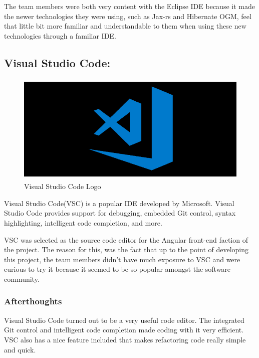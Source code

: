 The team members were both very content with the Eclipse IDE because it made the newer technologies they were using, such as Jax-rs and Hibernate OGM, feel that little bit more familiar and understandable to them when using these new technologies through a familiar IDE.


\subsection{Visual Studio Code:}
\label{sec:TechnologyReviewVSC}
\begin{figure}[H]
    \centering
    \includegraphics[width=\textwidth, height=150pt]{img/vscLogo.PNG}
    \caption{Visual Studio Code Logo}
    \label{fig:my_label}
\end{figure}

\bigskip

Visual Studio Code(VSC) is a popular IDE developed by Microsoft. Visual Studio Code provides support for debugging, embedded Git control, syntax highlighting, intelligent code completion, and more.

\bigskip

VSC was selected as the source code editor for the Angular front-end faction of the project. The reason for this, was the fact that up to the point of developing this project, the team members didn't have much exposure to VSC and were curious to try it because it seemed to be so popular amongst the software community. 

\subsubsection{Afterthoughts}

Visual Studio Code turned out to be a very useful code editor. The integrated Git control and intelligent code completion made coding with it very efficient. VSC also has a nice feature included that makes refactoring code really simple and quick.

